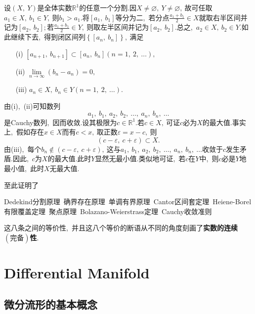 \begin{solution}
	设$\left(X,\ Y\right)$是全体实数$\mathbb{R}^1$的任意一个分割.因$X\neq\varnothing,\ Y\neq\varnothing,\ $故可任取$a_1\in X,\ b_1\in Y,\ $则$b_1>a_1.$将$\left[a_1,\ b_1\right]$等分为二,\ 若分点$\frac{a_1+b_1}{2}\in X$就取右半区间并记为$\left[a_2,\ b_2\right];$若$\frac{a_1+b_1}{2}\in Y,\ $则取左半区间并记为$\left[a_2,\ b_2\right].$总之,\ $a_2\in X,\ b_2\in Y.$如此继续下去,\ 得到闭区间列$\left\{\left[a_n,\ b_n\right]\right\},\ $满足
	\begin{itemize}
		\item[(i)] $\left[a_{n+1},\ b_{n+1}\right]\subset\left[a_n,\ b_n\right]\left(n=1,\ 2,\ \dots\right),\ $
		\item[(ii)]$\lim\limits_{n\rightarrow\infty}\left(b_n-a_n\right)=0,\ $
		\item[(iii)]$a_n\in X,\ b_n\in Y\left(n=1,\ 2,\ \dots\right).$
	\end{itemize}
	由(i),\ (ii)可知数列
	$$a_1,\ b_1,\ a_2,\ b_2,\ \dots,\ a_n,\ b_n,\ \dots$$
	是Cauchy数列,\ 因而收敛.设其极限为$c\in \mathbb{R}^1.$若$c\in X,\ $可证$c$必为$X$的最大值.事实上,\ 假如存在$x\in X$而有$c<x,\ $取正数$\varepsilon=x-c,\ $则
	$$\left(c-\varepsilon,\ c+\varepsilon\right)\subset X.$$
	由(iii),\ 每个$b_n\notin\left(c-\varepsilon,\ c+\varepsilon\right),\ $这与$a_1,\ b_1,\ a_2,\ b_2,\ \dots,\ a_n,\ b_n,\ \dots$收敛于$c$发生矛盾.因此,\ $c$为$X$的最大值.此时$Y$显然无最小值.类似地可证,\ 若$c$在$Y$中,\ 则$c$必是$Y$地最小值,\ 此时$X$无最大值.
	
	至此证明了
	
	Dedekind分割原理\ 确界存在原理\ 单调有界原理\ Cantor区间套定理\ Heiene-Borel有限覆盖定理\ 聚点原理\ Bolazano-Weierstrass定理\ Cauchy收敛准则 
	
	这八条之间的等价性,\ 并且这八个等价的断语从不同的角度刻画了\textbf{实数的连续$\left(\text{完备}\right)$性}.
\end{solution}
\chapter{Differential Manifold}
\section{微分流形的基本概念}
